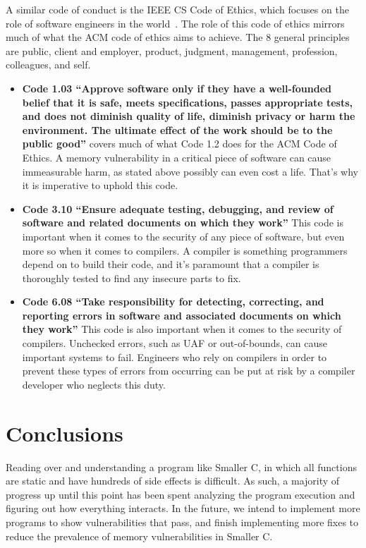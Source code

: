 \documentclass[sigconf, anonymous]{acmart}
\begin{document}
A similar code of conduct is the IEEE CS Code of Ethics, which focuses on the role of software engineers in the world~\cite{IEEECODE}. The role of this code of ethics mirrors much of what the ACM code of ethics aims to achieve. The 8 general principles are public, client and employer, product, judgment, management, profession, colleagues, and self. 

\begin{itemize}

\item \textbf{Code 1.03 “Approve software only if they have a well-founded belief that it is safe, meets specifications, passes appropriate tests, and does not diminish quality of life, diminish privacy or harm the environment. The ultimate effect of the work should be to the public good”} covers much of what Code 1.2 does for the ACM Code of Ethics. A memory vulnerability in a critical piece of software can cause immeasurable harm, as stated above possibly can even cost a life. That’s why it is imperative to uphold this code. 

\item \textbf{Code 3.10 “Ensure adequate testing, debugging, and review of software and related documents on which they work”} This code is important when it comes to the security of any piece of software, but even more so when it comes to compilers. A compiler is something programmers depend on to build their code, and it's paramount that a compiler is thoroughly tested to find any insecure parts to fix. 

\item \textbf{Code 6.08 “Take responsibility for detecting, correcting, and reporting errors in software and associated documents on which they work”} This code is also important when it comes to the security of compilers. Unchecked errors, such as UAF or out-of-bounds, can cause important systems to fail. Engineers who rely on compilers in order to prevent these types of errors from occurring can be put at risk by a compiler developer who neglects this duty.

\end{itemize}

\section{Conclusions}
\label{conclusions}

Reading over and understanding a program like Smaller C, in which all functions are static and have hundreds of side effects is difficult. As such, a majority of progress up until this point has been spent analyzing the program execution and figuring out how everything interacts. In the future, we intend to implement more programs to show vulnerabilities that pass, and finish implementing more fixes to reduce the prevalence of memory vulnerabilities in Smaller C. 
\end{document}
